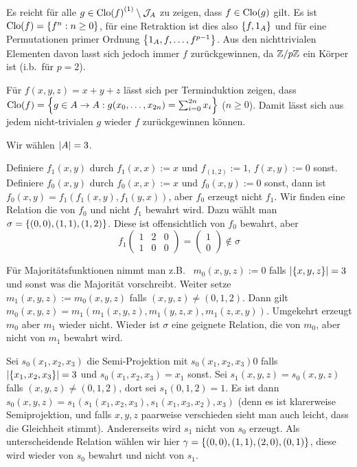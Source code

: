 \documentclass{book}
\begin{document}
\begin{solution}
    \begin{tasks}
            \item Es reicht für alle $g\in{\mathrm{Clo}(f)}^{(1)}\setminus\mathcal{J}_A$ zu zeigen, dass $f\in\mathrm{Clo}(g)$ gilt. Es ist $\mathrm{Clo}(f)=\left\{f^n:n\geq 0\right\}$, für eine Retraktion ist dies also $\left\{f,1_A\right\}$ und für eine Permutationen primer Ordnung $\left\{1_A,f,\ldots,f^{p-1}\right\}$. Aus den nichttrivialen Elementen davon lasst sich jedoch immer $f$ zurückgewinnen, da $\mathbb{Z}/p\mathbb{Z}$ ein Körper ist (i.b.~für $p=2$).
            \item Für $f(x,y,z)=x+y+z$ lässt sich per Terminduktion zeigen, dass $\mathrm{Clo}(f)=\left\{g\in A\rightarrow A: g(x_0,\ldots,x_{2n})=\sum_{i=0}^{2n}x_i\right\}$ ($n\geq 0$). Damit lässt sich aus jedem nicht-trivialen $g$ wieder $f$ zurückgewinnen können.
        \item Wir wählen $\left|A\right|=3$.
    \begin{tasks} 
            \item Definiere $f_1(x,y)$ durch $f_1(x,x):=x$ und $f_(1,2):=1$, $f(x,y):=0$ sonst. Definiere $f_0(x,y)$ durch $f_0(x,x):=x$ und $f_0(x,y):=0$ sonst, dann ist $f_0(x,y)=f_1(f_1(x,y),f_1(y,x))$, aber $f_0$ erzeugt nicht $f_1$. Wir finden eine Relation die von $f_0$ und nicht $f_1$ bewahrt wird. Dazu wählt man $\sigma=\left\{(0,0),(1,1),(1,2)\right\}$. Diese ist offensichtlich von $f_0$ bewahrt, aber
        $$
        f_1
        \begin{pmatrix}
            1 & 2 & 0 \\
            1 & 0 & 0
        \end{pmatrix}=
        \begin{pmatrix}
            1 \\
            0
        \end{pmatrix}\not\in\sigma
        $$
            \item Für Majoritätsfunktionen nimmt man z.B.~ $m_0(x,y,z):=0$ falls $\left|\left\{x,y,z\right\}\right|=3$ und sonst was die Majorität vorschreibt. Weiter setze $m_1(x,y,z):=m_0(x,y,z)$ falls $(x,y,z)\neq (0,1,2)$. Dann gilt $m_0(x,y,z)=m_1(m_1(x,y,z),m_1(y,z,x),m_1(z,x,y))$. Umgekehrt erzeugt $m_0$ aber $m_1$ wieder nicht. Wieder ist $\sigma$ eine geignete Relation, die von $m_0$, aber nicht von $m_1$ bewahrt wird.
            \item Sei $s_0(x_1,x_2,x_3)$ die Semi-Projektion mit $s_0(x_1,x_2,x_3)0$ falls $\left|\left\{x_1,x_2,x_3\right\}\right|=3$ und $s_0(x_1,x_2,x_3)=x_1$ sonst. Sei $s_1(x,y,z)=s_0(x,y,z)$ falls $(x,y,z)\neq(0,1,2)$, dort sei $s_1(0,1,2)=1$. Es ist dann $s_0(x,y,z)=s_1(s_1(x_1,x_2,x_3),s_1(x_1,x_3,x_2),x_3)$ (denn es ist klarerweise Semiprojektion, und falls $x,y,z$ paarweise verschieden sieht man auch leicht, dass die Gleichheit stimmt). Andererseits wird $s_1$ nicht von $s_0$ erzeugt.
        Als unterscheidende Relation wählen wir hier $\gamma=\left\{(0,0),(1,1),(2,0),(0,1)\right\}$, diese wird wieder von $s_0$ bewahrt und nicht von $s_1$.
    \end{tasks}
    \end{tasks}
\end{solution}
\end{document}
